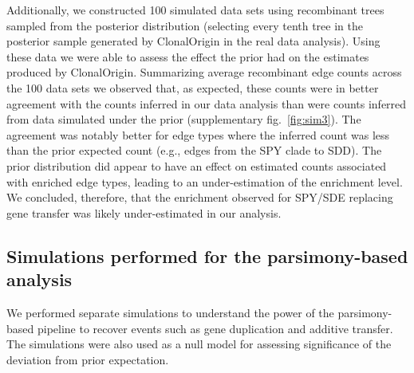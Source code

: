 \documentclass[12pt]{article}
\providecommand{\\}{\\}
\begin{document}
Additionally, we constructed 100 simulated data sets using recombinant trees
sampled from the posterior distribution (selecting every tenth tree in the
posterior sample generated by ClonalOrigin in the real data analysis). Using
these data we were able to assess the effect the prior had on the estimates
produced by ClonalOrigin.
Summarizing average recombinant edge counts across
the 100 data sets we observed that, as
expected, these counts were in better agreement with the counts inferred in our
data analysis than were counts inferred from data simulated under the
prior (supplementary fig.\ \ref{fig:sim3}). 
The agreement was notably better for edge types where the inferred
count was less than the prior expected count (e.g., edges from the SPY clade to
SDD). The prior distribution did appear to have an effect on estimated counts
associated with enriched edge types, leading to an under-estimation of the
enrichment level. We concluded, therefore, that the enrichment observed for
SPY/SDE replacing gene transfer was likely under-estimated in our analysis.

\subsection{Simulations performed for the parsimony-based analysis}

We performed separate simulations to understand the power of 
the parsimony-based pipeline to recover events such as gene duplication 
and additive transfer.  The simulations were also used as a null model
for assessing significance of the deviation from prior expectation.
\end{document}
